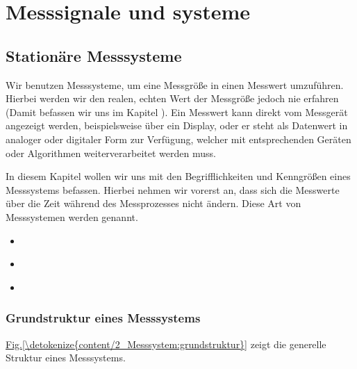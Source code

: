 \documentclass[letterpaper,10pt,english]{jupyterBook}
\begin{document}
\sphinxstepscope


\part{Messsignale und \sphinxhyphen{}systeme}

\sphinxstepscope


\chapter{Stationäre Messsysteme}
\label{\detokenize{content/2_Stationaer:stationare-messsysteme}}\label{\detokenize{content/2_Stationaer::doc}}
\sphinxAtStartPar
Wir benutzen Messsysteme, um eine Messgröße in einen Messwert umzuführen. Hierbei werden wir den realen, echten Wert der Messgröße jedoch nie erfahren (Damit befassen wir uns im Kapitel  {\hyperref[\detokenize{content/1_Messunsicherheiten::doc}]{}}).
Ein Messwert kann direkt vom Messgerät angezeigt werden, beispielsweise über ein Display, oder er steht als Datenwert in analoger oder digitaler Form zur Verfügung, welcher mit entsprechenden Geräten oder Algorithmen weiterverarbeitet werden muss.

\sphinxAtStartPar
In diesem Kapitel wollen wir uns mit den Begrifflichkeiten und Kenngrößen eines Messsystems befassen. Hierbei nehmen wir vorerst an, dass sich die Messwerte über die Zeit während des Messprozesses nicht ändern. Diese Art von Messsystemen werden  genannt.
\begin{itemize}
\item {} 
\sphinxAtStartPar
{\hyperref[\detokenize{content/2_Messsystem::doc}]{}}

\item {} 
\sphinxAtStartPar
{\hyperref[\detokenize{content/2_idealeKennlinie::doc}]{}}

\item {} 
\sphinxAtStartPar
{\hyperref[\detokenize{content/2_realeKennlinie::doc}]{}}

\end{itemize}

\sphinxstepscope


\section{Grundstruktur eines Messsystems}
\label{\detokenize{content/2_Messsystem:grundstruktur-eines-messsystems}}\label{\detokenize{content/2_Messsystem::doc}}
\sphinxAtStartPar
\hyperref[\detokenize{content/2_Messsystem:grundstruktur}]{Fig.\@ \ref{\detokenize{content/2_Messsystem:grundstruktur}}} zeigt die generelle Struktur eines Messsystems.
\end{document}
